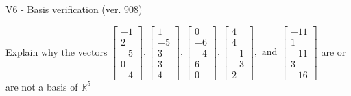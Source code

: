 \begin{exercise}
  \begin{exerciseTitle}V6 - Basis verification (ver. 908)\end{exerciseTitle}
  \begin{exerciseStatement}
    Explain why the vectors \(\left[\begin{array}{r}
-1 \\
2 \\
-5 \\
0 \\
-4
\end{array}\right] , \left[\begin{array}{r}
1 \\
-5 \\
3 \\
3 \\
4
\end{array}\right] , \left[\begin{array}{r}
0 \\
-6 \\
-4 \\
6 \\
0
\end{array}\right] , \left[\begin{array}{r}
4 \\
4 \\
-1 \\
-3 \\
2
\end{array}\right] , \text{ and } \left[\begin{array}{r}
-11 \\
1 \\
-11 \\
3 \\
-16
\end{array}\right]\) are or are not a basis of \(\mathbb{R}^5\)	



\end{exerciseStatement}
\end{exercise}
